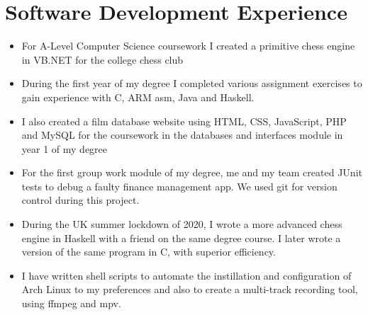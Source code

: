 \documentclass{article}
\begin{document}
\section{Software Development Experience}

\begin{itemize}[noitemsep]

\renewcommand{\labelitemi}{$\square$}
\item For A-Level Computer Science coursework I created a primitive chess engine in VB.NET for the college chess club
\item During the first year of my degree I completed various assignment exercises to gain experience with C, ARM asm, Java and Haskell.
\item I also created a film database website using HTML, CSS, JavaScript, PHP and MySQL for the coursework in the databases and interfaces module in year 1 of my degree
\item For the first group work module of my degree, me and my team created JUnit tests to debug a faulty finance management app. We used git for version control during this project.
\item During the UK summer lockdown of 2020, I wrote a more advanced chess engine in Haskell with a friend on the same degree course. I later wrote a version of the same program in C, with superior efficiency.
\item I have written shell scripts to automate the instillation and configuration of Arch Linux to my preferences and also to create a multi-track recording tool, using ffmpeg and mpv.

\end{itemize}
\end{document}

